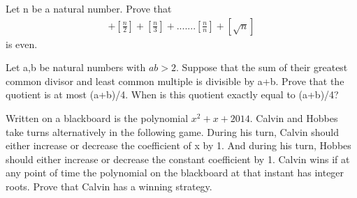 \item Let n be a natural number. Prove that
\begin{align*}
[\frac{1}{n}] + [\frac{n}{2}] + [\frac{n}{3}] + .......[\frac{n}{n}] + [\sqrt{n}]
\end{align*}
is even.

\item Let a,b be natural numbers with $ab > 2$. Suppose that the sum of their greatest common divisor and least common multiple is divisible by a+b. Prove that the quotient is at most (a+b)/4. When is this quotient exactly equal to (a+b)/4?

\item Written on a blackboard is the polynomial $x^{2} + x + 2014$. Calvin and Hobbes take turns alternatively in the following game. During his turn, Calvin should either increase or decrease the coefficient of x by 1. And during his turn, Hobbes should either increase or decrease the constant coefficient by 1. Calvin wins if at any point of time the polynomial on the blackboard at that instant has integer roots. Prove that Calvin has a winning strategy.














